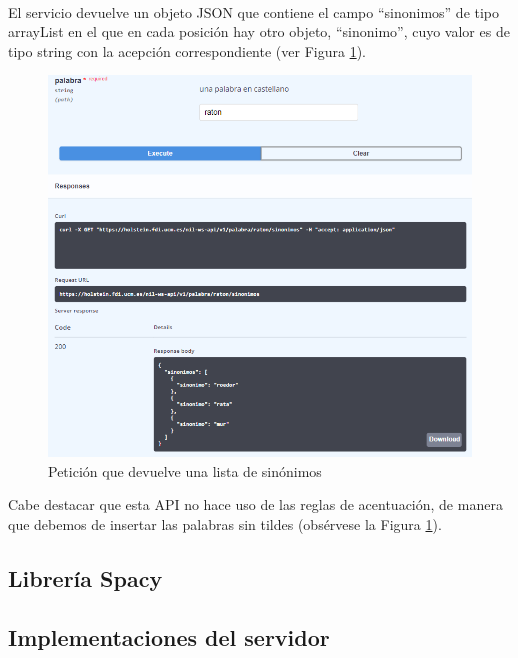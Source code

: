 \begin{itemize}
\begin{lstlisting}[backgroundcolor = \color{pink},
	xleftmargin = 1cm,
	framexleftmargin = 1em,frame=tlbr,framesep=4pt,framerule=1pt]
	
\end{lstlisting}



El servicio devuelve un objeto JSON que contiene el campo ``sinonimos'' de tipo arrayList en el que en cada posición hay otro objeto, ``sinonimo'', cuyo valor es de tipo string con la acepción correspondiente (ver Figura \ref{fig:apiSinonimo}).
\begin{figure}[h!]
	\centering
	
	
	\includegraphics[scale=1]{Imagenes/Figuras/APISinonimos}
	
	
	\caption{Petición que devuelve una lista de sinónimos}
	\label{fig:apiSinonimo}
\end{figure}
\end{itemize}

Cabe destacar que esta API no hace uso de las reglas de acentuación, de manera que debemos de insertar las palabras sin tildes (obsérvese la Figura \ref{fig:apiSinonimo}).

\subsection{Librería Spacy}

\subsection{Implementaciones del servidor}

